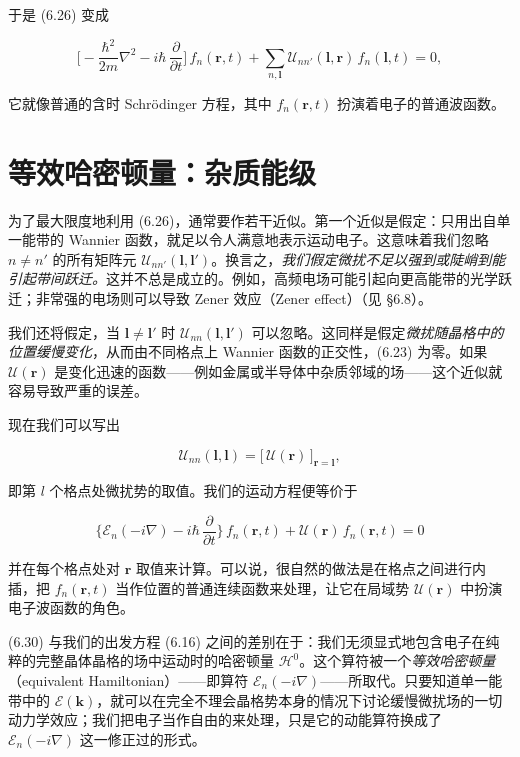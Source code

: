 于是 (6.26) 变成

\begin{equation*}
\Big[-\frac{\hbar^2}{2m}\nabla^2 - i\hbar\,\frac{\partial}{\partial t}\Big]\,f_n(\mathbf{r},t) + \sum_{n,\boldsymbol{l}} \mathcal{U}_{nn'}(\boldsymbol{l},\mathbf{r})\,f_n(\boldsymbol{l},t) = 0,
\tag{6.28}
\end{equation*}

它就像普通的含时 Schrödinger 方程，其中 $f_n(\mathbf{r},t)$ 扮演着电子的普通波函数。

\section{等效哈密顿量：杂质能级}

为了最大限度地利用 (6.26)，通常要作若干近似。第一个近似是假定：只用出自单一能带的 Wannier 函数，就足以令人满意地表示运动电子。这意味着我们忽略 $n \neq n'$ 的所有矩阵元 $\mathcal{U}_{nn'}(\boldsymbol{l},\boldsymbol{l}')$。换言之，\emph{我们假定微扰不足以强到或陡峭到能引起带间跃迁。}这并不总是成立的。例如，高频电场可能引起向更高能带的光学跃迁；非常强的电场则可以导致 Zener 效应（Zener effect）（见 §6.8）。

我们还将假定，当 $\boldsymbol{l} \neq \boldsymbol{l}'$ 时 $\mathcal{U}_{nn}(\boldsymbol{l},\boldsymbol{l}')$ 可以忽略。这同样是假定\emph{微扰随晶格中的位置缓慢变化}，从而由不同格点上 Wannier 函数的正交性，(6.23) 为零。如果 $\mathcal{U}(\mathbf{r})$ 是变化迅速的函数——例如金属或半导体中杂质邻域的场——这个近似就容易导致严重的误差。

现在我们可以写出

\begin{equation*}
\mathcal{U}_{nn}(\boldsymbol{l},\boldsymbol{l}) = \big[\,\mathcal{U}(\mathbf{r})\,\big]_{\mathbf{r}=\boldsymbol{l}},
\tag{6.29}
\end{equation*}

即第 $l$ 个格点处微扰势的取值。我们的运动方程便等价于

\begin{equation*}
\Big\{\mathcal{E}_n(-i\nabla) - i\hbar\,\frac{\partial}{\partial t}\Big\}\,f_n(\mathbf{r},t) + \mathcal{U}(\mathbf{r})\,f_n(\mathbf{r},t) = 0
\tag{6.30}
\end{equation*}

并在每个格点处对 $\mathbf{r}$ 取值来计算。可以说，很自然的做法是在格点之间进行内插，把 $f_n(\mathbf{r},t)$ 当作位置的普通连续函数来处理，让它在局域势 $\mathcal{U}(\mathbf{r})$ 中扮演电子波函数的角色。

(6.30) 与我们的出发方程 (6.16) 之间的差别在于：我们无须显式地包含电子在纯粹的完整晶体晶格的场中运动时的哈密顿量 $\mathcal{H}^0$。这个算符被一个\emph{等效哈密顿量}（equivalent Hamiltonian）——即算符 $\mathcal{E}_n(-i\nabla)$——所取代。只要知道单一能带中的 $\mathcal{E}(\mathbf{k})$，就可以在完全不理会晶格势本身的情况下讨论缓慢微扰场的一切动力学效应；我们把电子当作自由的来处理，只是它的动能算符换成了 $\mathcal{E}_n(-i\nabla)$ 这一修正过的形式。

